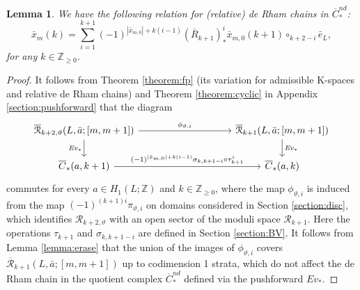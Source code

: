 \documentclass[a4paper]{article}
\newtheorem{lemma}[theorem]{Lemma}
\numberwithin{equation}{section}
\begin{document}
\begin{lemma}\label{lemma:vartheta}
We have the following relation for (relative) de Rham chains in $\overline{C}_\ast^\mathit{nd}$:
\begin{equation}
\bar{x}_m(k)=\sum_{i=1}^{k+1}(-1)^{|\bar{x}_{m,0}|+k(i-1)}(\overline{R}_{k+1})^i_\ast\bar{x}_{m,0}(k+1)\circ_{k+2-i}\bar{e}_L,
\end{equation}
for any $k\in\mathbb{Z}_{\geq0}$.
\end{lemma}
\begin{proof}
It follows from Theorem \ref{theorem:fp} (its variation for admissible K-spaces and relative de Rham chains) and Theorem \ref{theorem:cyclic} in Appendix \ref{section:pushforward} that the diagram
\begin{equation}
\begin{tikzcd}
    \overline{\mathcal{R}}_{k+2,\vartheta}(L,\bar{a};[m,m+1]) \arrow[rrrr, "\phi_{\vartheta,i}"] \arrow[d,"\mathit{Ev}_\ast"']
	&&&& \overline{\mathcal{R}}_{k+1}(L,\bar{a};[m,m+1]) \arrow[d, "\mathit{Ev}_\ast"] \\
	\overline{C}_\ast(a,k+1) \arrow[rrrr, "(-1)^{|\bar{x}_{m,0}|+k(i-1)}\sigma_{k,k+1-i}\circ\tau_{k+1}^i"]
	&&&& \overline{C}_\ast(a,k)
\end{tikzcd}
\end{equation}
commutes for every $a\in H_1(L;\mathbb{Z})$ and $k\in\mathbb{Z}_{\geq0}$, where the map $\phi_{\vartheta,i}$ is induced from the map $(-1)^{(k+1)i}\pi_{\vartheta,i}$ on domains considered in Section \ref{section:disc}, which identifies $\mathcal{R}_{k+2,\vartheta}$ with an open sector of the moduli space $\mathcal{R}_{k+1}$. Here the operations $\tau_{k+1}$ and $\sigma_{k,k+1-i}$ are defined in Section \ref{section:BV}. It follows from Lemma \ref{lemma:erase} that the union of the images of $\phi_{\vartheta,i}$ covers $\overline{\mathcal{R}}_{k+1}(L,\bar{a};[m,m+1])$ up to codimension 1 strata, which do not affect the de Rham chain in the quotient complex $\overline{C}_\ast^\mathit{nd}$ defined via the pushforward $\mathit{Ev}_\ast$.


\end{proof}
\end{document}

